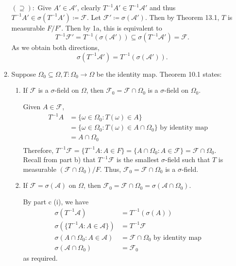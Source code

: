 \documentclass[12pt]{article}
\begin{document}
\begin{problem}[1]
\begin{enumerate}[label=\alph*)]
\begin{enumerate}[label=(\roman*)]
				$ ( \supseteq ):$ Give $ A' \in \mathcal{A}'$, clearly $ T^{-1}A' \in T^{-1} \mathcal{A}'$ and thus $ T^{-1}A' \in \sigma(T^{-1}A') \coloneqq \mathcal{F}$. Let $ \mathcal{F}' \coloneqq \sigma(\mathcal{A}')$. Then by Theorem 13.1, $ T$ is measurable $ F / F'$. Then by  1a, this is equivalent to
				\[
					T^{-1}\mathcal{F}' = T^{-1}( \sigma(\mathcal{A}')) \subseteq \sigma(T^{-1} \mathcal{A}') = \mathcal{F}
				.\]
				As we obtain both directions, 
				\[
					\sigma(T^{-1} \mathcal{A}') = T^{-1}( \sigma(\mathcal{A}'))
				.\] 
			\item Suppose $ \Omega_0 \subseteq \Omega, T: \Omega_0 \to \Omega$ be the identity map. Theorem 10.1 states:
			~\begin{enumerate}[label=\arabic*)]
				\item If $ \mathcal{F}$ is a $\sigma$-field on $ \Omega$, then $ \mathcal{F}_0 = \mathcal{F} \cap \Omega_0$ is a $\sigma$-field on $ \Omega_0$.
					\begin{prf}
					Given $ A \in \mathcal{F}$, 
					\begin{align*}
						T^{-1}A&= \{\omega \in \Omega_0: T(\omega) \in A\}  \\
						       &= \{\omega \in \Omega_0 : T(\omega) \in A \cap \Omega_0\} \text{ by identity map}  \\
						       &= A \cap \Omega_0 \\
					\end{align*}
					Therefore, $ T^{-1}\mathcal{F} = \{T^{-1}A: A \in F\} = \{A \cap \Omega_0: A \in \mathcal{F}\} =  \mathcal{F} \cap \Omega_0$. Recall from part b) that $ T^{-1}\mathcal{F}$ is the smallest $\sigma$-field such that $ T$ is measurable  $(\mathcal{F} \cap \Omega_0) / F$. Thus, $ \mathcal{F}_0 = \mathcal{F} \cap \Omega_0$ is a $\sigma$-field.
					\end{prf}
				\item If $ \mathcal{F} = \sigma(\mathcal{A})$ on $ \Omega$, then $ \mathcal{F}_0 = \mathcal{F} \cap \Omega_0 = \sigma(\mathcal{A} \cap \Omega_0)$.
					\begin{prf}
						By part c (i), we have
						\begin{align*}
							\sigma(T^{-1} \mathcal{A}) &= T^{-1}( \sigma(A)) \\
							\sigma( \{T^{-1}A: A \in \mathcal{A}\} )&= T^{-1} \mathcal{F} \\
							\sigma(A \cap \Omega_0 : A \in \mathcal{A}) &= \mathcal{F} \cap \Omega_0 \text{ by identity map} \\
							\sigma(\mathcal{A} \cap \Omega_0)&= \mathcal{F}_0
						\end{align*}
						as required.
					\end{prf}
			\end{enumerate}
		\end{enumerate}

\end{enumerate}
\end{problem}
\end{document}
